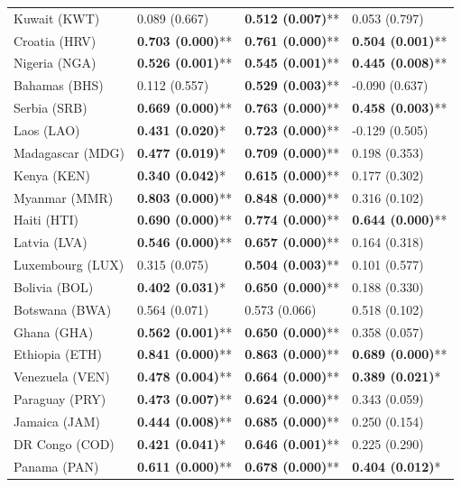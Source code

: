 \begin{longtable}{p{4cm}p{3cm}p{3cm}p{3cm}}
Kuwait (KWT) & 0.089 (0.667) & \textbf{0.512 (0.007)}** & 0.053 (0.797) \\
Croatia (HRV) & \textbf{0.703 (0.000)}** & \textbf{0.761 (0.000)}** & \textbf{0.504 (0.001)}** \\
Nigeria (NGA) & \textbf{0.526 (0.001)}** & \textbf{0.545 (0.001)}** & \textbf{0.445 (0.008)}** \\
Bahamas (BHS) & 0.112 (0.557) & \textbf{0.529 (0.003)}** & -0.090 (0.637) \\
Serbia (SRB) & \textbf{0.669 (0.000)}** & \textbf{0.763 (0.000)}** & \textbf{0.458 (0.003)}** \\
Laos (LAO) & \textbf{0.431 (0.020)}* & \textbf{0.723 (0.000)}** & -0.129 (0.505) \\
Madagascar (MDG) & \textbf{0.477 (0.019)}* & \textbf{0.709 (0.000)}** & 0.198 (0.353) \\
Kenya (KEN) & \textbf{0.340 (0.042)}* & \textbf{0.615 (0.000)}** & 0.177 (0.302) \\
Myanmar (MMR) & \textbf{0.803 (0.000)}** & \textbf{0.848 (0.000)}** & 0.316 (0.102) \\
Haiti (HTI) & \textbf{0.690 (0.000)}** & \textbf{0.774 (0.000)}** & \textbf{0.644 (0.000)}** \\
Latvia (LVA) & \textbf{0.546 (0.000)}** & \textbf{0.657 (0.000)}** & 0.164 (0.318) \\
Luxembourg (LUX) & 0.315 (0.075) & \textbf{0.504 (0.003)}** & 0.101 (0.577) \\
Bolivia (BOL) & \textbf{0.402 (0.031)}* & \textbf{0.650 (0.000)}** & 0.188 (0.330) \\
Botswana (BWA) & 0.564 (0.071) & 0.573 (0.066) & 0.518 (0.102) \\
Ghana (GHA) & \textbf{0.562 (0.001)}** & \textbf{0.650 (0.000)}** & 0.358 (0.057) \\
Ethiopia (ETH) & \textbf{0.841 (0.000)}** & \textbf{0.863 (0.000)}** & \textbf{0.689 (0.000)}** \\
Venezuela (VEN) & \textbf{0.478 (0.004)}** & \textbf{0.664 (0.000)}** & \textbf{0.389 (0.021)}* \\
Paraguay (PRY) & \textbf{0.473 (0.007)}** & \textbf{0.624 (0.000)}** & 0.343 (0.059) \\
Jamaica (JAM) & \textbf{0.444 (0.008)}** & \textbf{0.685 (0.000)}** & 0.250 (0.154) \\
DR Congo (COD) & \textbf{0.421 (0.041)}* & \textbf{0.646 (0.001)}** & 0.225 (0.290) \\
Panama (PAN) & \textbf{0.611 (0.000)}** & \textbf{0.678 (0.000)}** & \textbf{0.404 (0.012)}* \\

\end{longtable}
